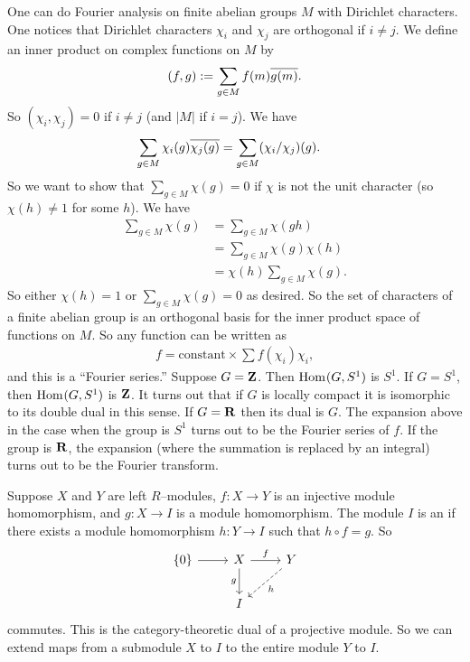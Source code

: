 \documentclass[11pt, oneside,margin=1in]{article}
\begin{document}
One can do Fourier analysis on finite abelian groups $M$ with Dirichlet characters. One notices that Dirichlet characters $\chi_i$ and $\chi_j$ are orthogonal if $i\ne j$. We define an inner product on complex functions on $M$ by
\begin{align*}
	(f,g) := \sum_{g\in M} f (m) \overline{g (m)}.
\end{align*}
So $(\chi_i, \chi_j) = 0$ if $i\ne j$ (and $\left\lvert M \right\rvert $ if $i=j$). We have
\begin{align*}
	\sum_{g\in M} \chi_i(g) \overline{\chi_j (g)} &= \sum_{g\in M}  (\chi_i/\chi_j) (g).
\end{align*}
So we want to show that $\sum_{g\in M} \chi(g)=0$ if $\chi$ is not the unit character (so $\chi(h) \ne 1$ for some $h$). We have
\begin{align*}
	\sum_{g\in M} \chi(g) &= \sum_{g\in M} \chi(gh)\\
			      &= \sum_{g\in M} \chi (g)\chi (h)\\
			      &= \chi (h)\sum_{g\in M} \chi (g).
\end{align*}
So either $\chi(h) =1$ or $\sum_{g\in M} \chi(g)=0$ as desired. So the set of characters of a finite abelian group is an orthogonal basis for the inner product space of functions on $M$. So any function can be written as
\begin{align*}
	f = \mathrm{constant} \times \sum f(\chi_i) \chi_i,
\end{align*}
and this is a ``Fourier series.'' Suppose $G=\mathbf Z$. Then $\operatorname{Hom}_{}(G, S^1)$ is $S^1$. If $G= S^1$, then $\operatorname{Hom}_{}(G, S^1)$ is $\mathbf Z$. It turns out that if $G$ is locally compact it is isomorphic to its double dual in this sense. If $G=\mathbf R$ then its dual is $G$. The expansion above in the case when the group is $S^1$ turns out to be the Fourier series of $f$. If the group is $\mathbf R$, the expansion (where the summation is replaced by an integral) turns out to be the Fourier transform.

\begin{definition}[ ]\label{}
Suppose $X$ and $Y$ are left $R$--modules, $f:X\longrightarrow  Y$ is an injective module homomorphism, and $g: X\longrightarrow I$ is a module homomorphism. The module $I$ is an  if there exists a module homomorphism $h:Y\longrightarrow I$ such that $h\circ f = g$. So 
\[
\begin{tikzcd}
	\{0\} \arrow[r] & X \arrow[r, "f"] \arrow[d,swap,"g"] & Y \arrow[dl, "h", dashed] \\
			& I &
\end{tikzcd}
\]
commutes. This is the category-theoretic dual of a projective module. So we can extend maps from a submodule $X$ to $I$ to the entire module $Y$ to $I$.
\end{definition}
\end{document}
